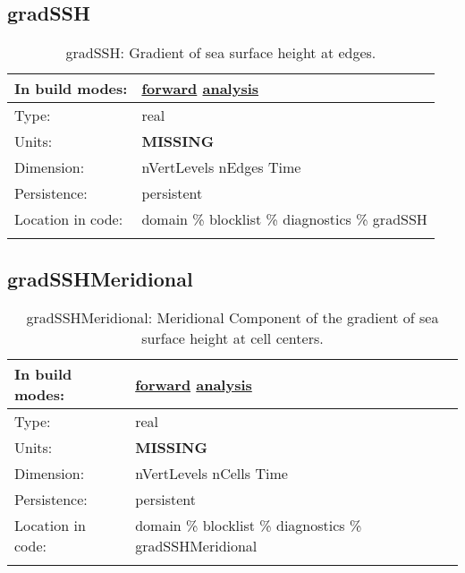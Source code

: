 \subsection[gradSSH]{gradSSH}
\label{subsec:var_sec_diagnostics_gradSSH}
\begin{center}
\begin{longtable}{| p{2.0in} | p{4.0in} |}
        \hline 
        In build modes: & \hyperref[subsec:forward_var_tab_diagnostics]{forward} \hyperref[subsec:analysis_var_tab_diagnostics]{analysis} \\
        \hline 
        Type: & real \\
        \hline 
        Units: & {\bf \color{red} MISSING} \\
        \hline 
        Dimension: & nVertLevels nEdges Time \\
        \hline 
        Persistence: & persistent \\
        \hline 
		 Location in code: & domain \% blocklist \% diagnostics \% gradSSH \\
		 \hline 
    \caption{gradSSH: Gradient of sea surface height at edges.}
\end{longtable}
\end{center}
\subsection[gradSSHMeridional]{gradSSHMeridional}
\label{subsec:var_sec_diagnostics_gradSSHMeridional}
\begin{center}
\begin{longtable}{| p{2.0in} | p{4.0in} |}
        \hline 
        In build modes: & \hyperref[subsec:forward_var_tab_diagnostics]{forward} \hyperref[subsec:analysis_var_tab_diagnostics]{analysis} \\
        \hline 
        Type: & real \\
        \hline 
        Units: & {\bf \color{red} MISSING} \\
        \hline 
        Dimension: & nVertLevels nCells Time \\
        \hline 
        Persistence: & persistent \\
        \hline 
		 Location in code: & domain \% blocklist \% diagnostics \% gradSSHMeridional \\
		 \hline 
    \caption{gradSSHMeridional: Meridional Component of the gradient of sea surface height at cell centers.}
\end{longtable}
\end{center}
